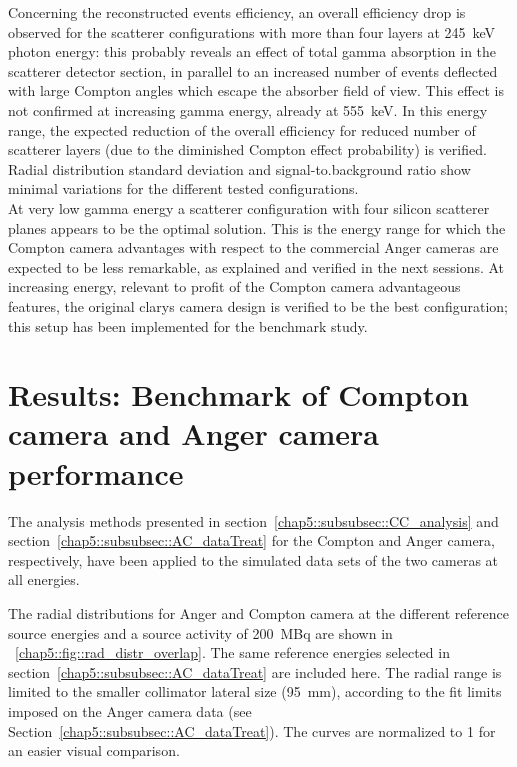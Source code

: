 Concerning the reconstructed events efficiency, an overall efficiency drop is observed for the scatterer configurations with more than four layers at 245~keV photon energy: this probably reveals an effect of total gamma absorption in the scatterer detector section, in parallel to an increased number of events deflected with large Compton angles which escape the absorber field of view. This effect is not confirmed at increasing gamma energy, already at 555~keV. In this energy range, the expected reduction of the overall efficiency for reduced number of scatterer layers (due to the diminished Compton effect probability) is verified. Radial distribution standard deviation and signal-to.background ratio show minimal variations for the different tested configurations.\\
At very low gamma energy a scatterer configuration with four silicon scatterer planes appears to be the optimal solution. This is the energy range for which the Compton camera advantages with respect to the commercial Anger cameras are expected to be less remarkable, as explained and verified in the next sessions. At increasing energy, relevant to profit of the Compton camera advantageous features, the original \gls{clarys} camera design is verified to be the best configuration; this setup has been implemented for the benchmark study.   


\section{Results: Benchmark of Compton camera and Anger camera performance}\label{chap5::sec::Results_benchmark}

The analysis methods presented in section~\ref{chap5::subsubsec::CC_analysis} and section~\ref{chap5::subsubsec::AC_dataTreat} for the Compton and Anger camera, respectively, have been applied to the simulated data sets of the two cameras at all energies.

The radial distributions for Anger and Compton camera at the different reference source energies and a source activity of 200~MBq are shown in \figurename~\ref{chap5::fig::rad_distr_overlap}. The same reference energies selected in section~\ref{chap5::subsubsec::AC_dataTreat} are included here. The radial range is limited to the smaller collimator lateral size (95~mm), according to the fit limits imposed on the Anger camera data (see Section~\ref{chap5::subsubsec::AC_dataTreat}). The curves are normalized to 1 for an easier visual comparison.

